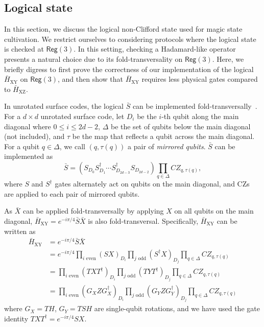 \documentclass[%
    aps, 
    physrev,
    reprint,
]{revtex4-2}
\newcommand{\reg}[1]{\mathsf{Reg}(#1)}
\newcommand{\XY}{_\mathrm{XY}}
\newcommand{\dg}{^\dagger}
\begin{document}
\subsection{Logical state} \label{app:HXY-encode}

In this section, we discuss the logical non-Clifford state used for magic state cultivation.
We restrict ourselves to considering protocols where the logical state is checked at $\reg3$. 
In this setting, checking a Hadamard-like operator presents a natural choice due to its fold-transversality on $\reg3$. 
Here, we briefly digress to first prove the correctness of our implementation of the logical $\bar{H}\XY$ on $\reg3$, and then show that  $\bar{H}\XY$ requires less physical gates compared to 
$\bar{H}_\mathrm{XZ}$. 

In unrotated surface codes, the logical $\bar{S}$ can be implemented fold-transversally~\cite{moussa2016transversal,breuckmann2024fold}. 
For a $d\times d$ unrotated surface code, let $D_i$ be the $i$-th qubit along the main diagonal where $0\leq i \leq 2d-2$, $\Delta$ be the set of qubits below the main diagonal (not included), and $\tau$ be the map that reflects a qubit across the main diagonal. 
For a qubit $q\in\Delta$, we call $(q, \tau(q))$ a pair of \textit{mirrored qubits}. 
$\bar{S}$ can be implemented as
\begin{equation}
    \bar{S} 
    = 
    \left( S_{D_0} S\dg_{D_1} \cdots S\dg_{D_{2d-3}} S_{D_{2d-2}} \right) 
    \prod_{q \in \Delta} CZ_{q, \tau(q)}
    ,
\end{equation}
where $S$ and $S\dg$ gates alternately act on qubits on the main diagonal, and CZs are applied to each pair of mirrored qubits.

As $\bar{X}$ can be applied fold-transversally by applying $X$ on all qubits on the main diagonal, 
$\bar{H}\XY = e^{-i\pi/4} \bar{S} \bar{X}$ is {also} fold-transversal. 
Specifically, $\bar{H}\XY$ can be written as
\begin{equation}
    \begin{aligned} 
        \label{eq: HXY details}
        \bar{H}\XY
        &= 
        e^{-i\pi/4} \bar{S} \bar{X} 
        \\
        &= 
        e^{-i\pi/4} 
        \prod_{i\text{ even}}(SX)_{D_i} 
        \prod_{j\text{ odd}}(S\dg X)_{D_j} 
        \prod_{q \in \Delta} CZ_{q, \tau(q)} 
        \\
        &= 
        \prod_{i\text{ even}}(TXT\dg)_{D_i} 
        \prod_{j\text{ odd}}(TYT\dg)_{D_j}  
        \prod_{q \in \Delta} CZ_{q, \tau(q)}
        \\
        &= 
        \prod_{i\text{ even}}(G_X Z G_X\dg)_{D_i}  
        \prod_{j\text{ odd}}(G_Y Z G_Y\dg)_{D_j} 
        \prod_{q \in \Delta} CZ_{q, \tau(q)}
    \end{aligned}
\end{equation}
where $G_X=TH$, $G_Y=TSH$ are single-qubit rotations, and we have used the gate identity $TXT\dg = e^{-i\pi/4}SX$. 
\end{document}
